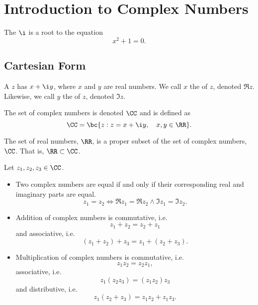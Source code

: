 \chapter{Introduction to Complex Numbers}\label{chap:Introduction-to-Complex-Numbers}

\begin{definition}
    The  $\i$ is a root to the equation \[x^2 + 1 = 0.\]
\end{definition}

\section{Cartesian Form}

\begin{definition}
    A  $z$ has  $x + \i y$, where $x$ and $y$ are real numbers. We call $x$ the  of $z$, denoted $\Re z$. Likewise, we call $y$ the  of $z$, denoted $\Im z$.
\end{definition}

\begin{definition}
    The set of complex numbers is denoted $\CC$ and is defined as \[\CC = \bc{z : z = x + \i y , \quad x, y \in \RR}.\]
\end{definition}
\begin{remark}
    The set of real numbers, $\RR$, is a proper subset of the set of complex numbers, $\CC$. That is, $\RR \subset \CC$.
\end{remark}

\begin{fact}
    Let $z_1, z_2, z_3 \in \CC$.
    \begin{itemize}
        \item Two complex numbers are equal if and only if their corresponding real and imaginary parts are equal. \[z_1 = z_2 \iff \Re z_1 = \Re z_2 \land \Im z_1 = \Im z_2.\]
        \item Addition of complex numbers is commutative, i.e. \[z_1 + z_2 = z_2 + z_1\] and associative, i.e. \[(z_1 + z_2) + z_3 = z_1 + (z_2 + z_3).\]
        \item Multiplication of complex numbers is commutative, i.e. \[z_1z_2 = z_2z_1,\] associative, i.e. \[z_1(z_2z_3) = (z_1z_2)z_3\] and distributive, i.e. \[z_1(z_2 + z_3) = z_1z_2 + z_1z_3.\]
    \end{itemize}
\end{fact}

